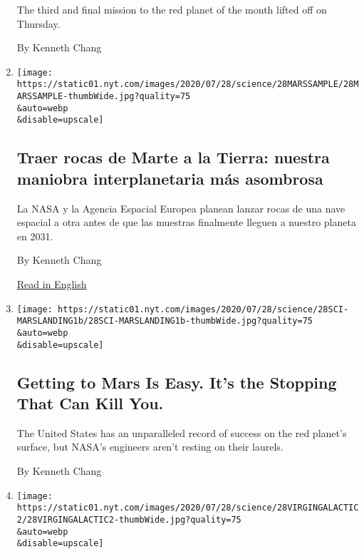 \begin{enumerate}
  The third and final mission to the red planet of the month lifted off
  on Thursday.

  By Kenneth Chang
\item
  \href{/es/2020/07/29/espanol/ciencia-y-tecnologia/mision-marte-nasa.html}{}

  \texttt{[image: https://static01.nyt.com/images/2020/07/28/science/28MARSSAMPLE/28MARSSAMPLE-thumbWide.jpg?quality=75\\\&auto=webp\\\&disable=upscale]}

  \hypertarget{traer-rocas-de-marte-a-la-tierra-nuestra-maniobra-interplanetaria-muxe1s-asombrosa}{%
  \subsection{Traer rocas de Marte a la Tierra: nuestra maniobra
  interplanetaria más
  asombrosa}\label{traer-rocas-de-marte-a-la-tierra-nuestra-maniobra-interplanetaria-muxe1s-asombrosa}}

  La NASA y la Agencia Espacial Europea planean lanzar rocas de una nave
  espacial a otra antes de que las muestras finalmente lleguen a nuestro
  planeta en 2031.

  By Kenneth Chang

  \href{https://www.nytimes.com/2020/07/28/science/mars-sample-return-mission.html}{Read
  in English}
\item
  \href{/2020/07/29/science/nasa-mars-perseverance-rover.html}{}

  \texttt{[image: https://static01.nyt.com/images/2020/07/28/science/28SCI-MARSLANDING1b/28SCI-MARSLANDING1b-thumbWide.jpg?quality=75\\\&auto=webp\\\&disable=upscale]}

  \hypertarget{getting-to-mars-is-easy-its-the-stopping-that-can-kill-you}{%
  \subsection{Getting to Mars Is Easy. It's the Stopping That Can Kill
  You.}\label{getting-to-mars-is-easy-its-the-stopping-that-can-kill-you}}

  The United States has an unparalleled record of success on the red
  planet's surface, but NASA's engineers aren't resting on their
  laurels.

  By Kenneth Chang
\item
  \href{/2020/07/28/science/virgin-galactic-cabin.html}{}

  \texttt{[image: https://static01.nyt.com/images/2020/07/28/science/28VIRGINGALACTIC2/28VIRGINGALACTIC2-thumbWide.jpg?quality=75\\\&auto=webp\\\&disable=upscale]}


\end{enumerate}
